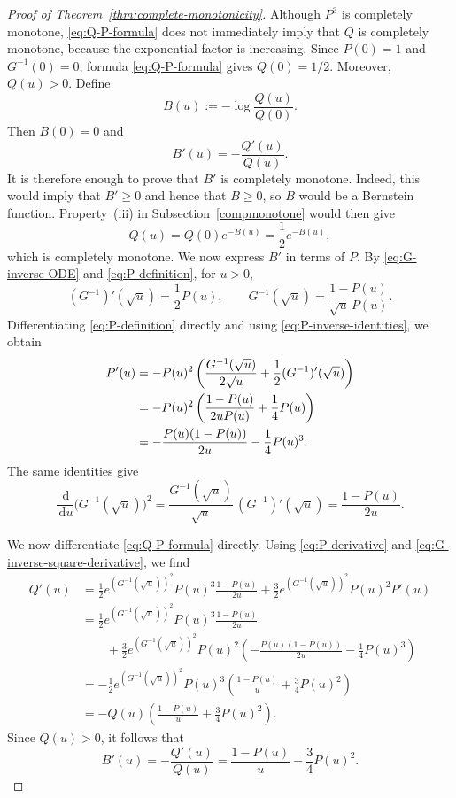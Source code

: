 \documentclass[10pt,a4paper]{amsart}
\newcommand{\dd}{\,\mathrm d}
\begin{document}
\begin{proof}[Proof of Theorem~\ref{thm:complete-monotonicity}]
Although $P^3$ is completely monotone,
\eqref{eq:Q-P-formula} does not immediately imply that $Q$ is
completely monotone, because the exponential factor is increasing.
Since $P(0)=1$ and $G^{-1}(0)=0$, formula
\eqref{eq:Q-P-formula} gives $Q(0)=1/2$.  Moreover, $Q(u)>0$.
Define
\begin{equation}\label{eq:B}
 B(u):=-\log\frac{Q(u)}{Q(0)}.
\end{equation}
Then $B(0)=0$ and
\[
 B'(u)=-\frac{Q'(u)}{Q(u)}.
\]
It is therefore enough to prove that $B'$ is completely monotone.
Indeed, this would imply that $B'\geq0$ and hence that $B\geq0$, so
$B$ would be a Bernstein function.  Property~(iii) in
Subsection~\ref{compmonotone} would then give
\[
 Q(u)=Q(0)e^{-B(u)}=\frac12e^{-B(u)},
\]
which is completely monotone.  We now express $B'$ in terms of $P$.  By
\eqref{eq:G-inverse-ODE} and \eqref{eq:P-definition}, for $u>0$,
\begin{equation}\label{eq:P-inverse-identities}
 (G^{-1})'(\sqrt{u})=\frac12P(u),
 \qquad
 G^{-1}(\sqrt{u})
 =\frac{1-P(u)}{\sqrt{u}\,P(u)}.
\end{equation}
Differentiating \eqref{eq:P-definition} directly and using
\eqref{eq:P-inverse-identities}, we obtain
\begin{align}
 P'(u)
 &=-P(u)^2\left(
 \frac{G^{-1}(\sqrt{u})}{2\sqrt{u}}
 +\frac12(G^{-1})'(\sqrt{u})
 \right) \notag\\
 &=-P(u)^2\left(
 \frac{1-P(u)}{2uP(u)}+\frac14P(u)
 \right) \notag\\
 &=-\frac{P(u)(1-P(u))}{2u}-\frac14P(u)^3.
 \label{eq:P-derivative}
\end{align}
The same identities give
\begin{equation}\label{eq:G-inverse-square-derivative}
 \frac{\dd}{\dd u}\bigl(G^{-1}(\sqrt{u})\bigr)^2
 =
 \frac{G^{-1}(\sqrt{u})}{\sqrt{u}}\,
 (G^{-1})'(\sqrt{u})
 =\frac{1-P(u)}{2u}.
\end{equation}

We now differentiate \eqref{eq:Q-P-formula} directly.  Using
\eqref{eq:P-derivative} and
\eqref{eq:G-inverse-square-derivative}, we find
\begin{align*}
 Q'(u)
 &=
 \frac12e^{(G^{-1}(\sqrt{u}))^2}P(u)^3
 \frac{1-P(u)}{2u}
 +\frac32e^{(G^{-1}(\sqrt{u}))^2}P(u)^2P'(u)
 \\
 &=
 \frac12e^{(G^{-1}(\sqrt{u}))^2}P(u)^3
 \frac{1-P(u)}{2u}
 \\
 &\qquad
 +\frac32e^{(G^{-1}(\sqrt{u}))^2}P(u)^2
 \left(
 -\frac{P(u)(1-P(u))}{2u}-\frac14P(u)^3
 \right)
 \\
 &=
 -\frac12e^{(G^{-1}(\sqrt{u}))^2}P(u)^3
 \left(
 \frac{1-P(u)}u+\frac34P(u)^2
 \right)
 \\
 &=
 -Q(u)\left(
 \frac{1-P(u)}u+\frac34P(u)^2
 \right).
\end{align*}
Since $Q(u)>0$, it follows that
\begin{equation}\label{eq:Q-log-derivative}
 B'(u)=-\frac{Q'(u)}{Q(u)}
 =\frac{1-P(u)}u+\frac34P(u)^2.
\end{equation}


\end{proof}
\end{document}
